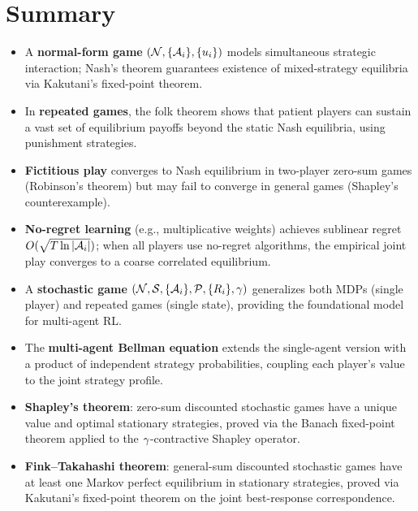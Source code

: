 \documentclass[11pt,a4paper]{article}
\begin{document}
\section{Summary}
\label{sec:summary}

\begin{itemize}
  \item A \textbf{normal-form game}
    $(\mathcal{N}, \{\mathcal{A}_i\}, \{u_i\})$ models simultaneous
    strategic interaction; Nash's theorem guarantees existence of
    mixed-strategy equilibria via Kakutani's fixed-point theorem.

  \item In \textbf{repeated games}, the folk theorem shows that
    patient players can sustain a vast set of equilibrium payoffs
    beyond the static Nash equilibria, using punishment strategies.

  \item \textbf{Fictitious play} converges to Nash equilibrium in
    two-player zero-sum games (Robinson's theorem) but may fail to
    converge in general games (Shapley's counterexample).

  \item \textbf{No-regret learning} (e.g., multiplicative weights)
    achieves sublinear regret $O(\sqrt{T \ln |\mathcal{A}_i|})$; when
    all players use no-regret algorithms, the empirical joint play
    converges to a coarse correlated equilibrium.

  \item A \textbf{stochastic game}
    $(\mathcal{N}, \mathcal{S}, \{\mathcal{A}_i\}, \mathcal{P}, \{R_i\}, \gamma)$
    generalizes both MDPs (single player) and repeated games (single
    state), providing the foundational model for multi-agent RL.

  \item The \textbf{multi-agent Bellman equation} extends the
    single-agent version with a product of independent strategy
    probabilities, coupling each player's value to the joint
    strategy profile.

  \item \textbf{Shapley's theorem}: zero-sum discounted stochastic
    games have a unique value and optimal stationary strategies,
    proved via the Banach fixed-point theorem applied to the
    $\gamma$-contractive Shapley operator.

  \item \textbf{Fink--Takahashi theorem}: general-sum discounted
    stochastic games have at least one Markov perfect equilibrium
    in stationary strategies, proved via Kakutani's fixed-point
    theorem on the joint best-response correspondence.


\end{itemize}
\end{document}
